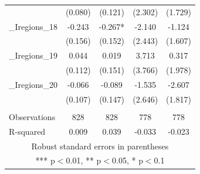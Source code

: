 \documentclass[]{article}
\begin{document}
\begin{tabular}{lcccc}
 & (0.080) & (0.121) & (2.302) & (1.729) \\
\_Iregions\_18 & -0.243 & -0.267* & -2.140 & -1.124 \\
 & (0.156) & (0.152) & (2.443) & (1.607) \\
\_Iregions\_19 & 0.044 & 0.019 & 3.713 & 0.317 \\
 & (0.112) & (0.151) & (3.766) & (1.978) \\
\_Iregions\_20 & -0.066 & -0.089 & -1.535 & -2.607 \\
 & (0.107) & (0.147) & (2.646) & (1.817) \\
 &  &  &  &  \\
Observations & 828 & 828 & 778 & 778 \\
 R-squared & 0.009 & 0.039 & -0.033 & -0.023 \\ \hline
\multicolumn{5}{c}{ Robust standard errors in parentheses} \\
\multicolumn{5}{c}{ *** p$<$0.01, ** p$<$0.05, * p$<$0.1} \\
\end{tabular}
\end{document}
